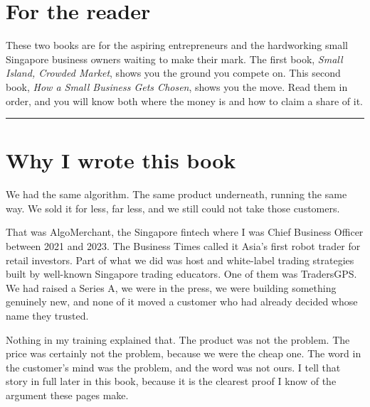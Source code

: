 \documentclass[10pt,twoside,openany]{memoir}
\begin{document}
\frontmatter
\setcounter{tocdepth}{0}   %
\begingroup
{}
\tableofcontents*
\endgroup

\FloatBarrier
\chapter{For the reader}\label{for-the-reader}

These two books are for the aspiring entrepreneurs and the hardworking
small Singapore business owners waiting to make their mark. The first
book, \emph{Small Island, Crowded Market}, shows you the ground you
compete on. This second book, \emph{How a Small Business Gets Chosen},
shows you the move. Read them in order, and you will know both where the
money is and how to claim a share of it.

\begin{center}\rule{0.5\linewidth}{0.5pt}\end{center}

\FloatBarrier
\chapter{Why I wrote this book}\label{why-i-wrote-this-book}

We had the same algorithm. The same product underneath, running the same
way. We sold it for less, far less, and we still could not take those
customers.

That was AlgoMerchant, the Singapore fintech where I was Chief Business
Officer between 2021 and 2023. The Business Times called it Asia's first
robot trader for retail investors. Part of what we did was host and
white-label trading strategies built by well-known Singapore trading
educators. One of them was TradersGPS. We had raised a Series A, we were
in the press, we were building something genuinely new, and none of it
moved a customer who had already decided whose name they trusted.

Nothing in my training explained that. The product was not the problem.
The price was certainly not the problem, because we were the cheap one.
The word in the customer's mind was the problem, and the word was not
ours. I tell that story in full later in this book, because it is the
clearest proof I know of the argument these pages make.
\end{document}
